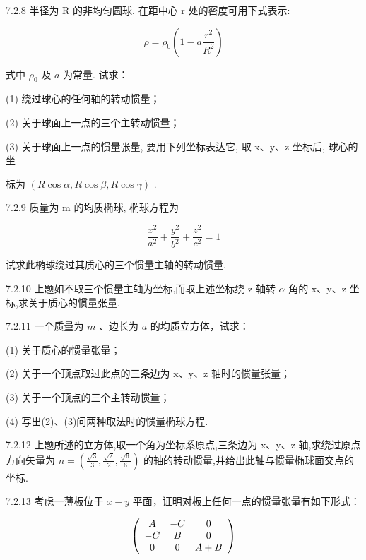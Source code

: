 \begin{problem}{7.2.8}
半径为 R 的非均匀圆球, 在距中心 r 处的密度可用下式表示:

\[
\rho = \rho_ {0} \left(1 - a \frac {r ^ {2}}{R ^ {2}}\right)
\]

式中 $\rho_0$ 及 $a$ 为常量. 试求：

(1) 绕过球心的任何轴的转动惯量；

(2) 关于球面上一点的三个主转动惯量；

(3) 关于球面上一点的惯量张量, 要用下列坐标表达它, 取 x、y、z 坐标后, 球心的坐

标为 $(R\cos\alpha,R\cos\beta,R\cos\gamma)$ .
\end{problem}
\clearpage


\begin{problem}{7.2.9}
质量为 m 的均质椭球, 椭球方程为

\[
\frac {x ^ {2}}{a ^ {2}} + \frac {y ^ {2}}{b ^ {2}} + \frac {z ^ {2}}{c ^ {2}} = 1
\]

试求此椭球绕过其质心的三个惯量主轴的转动惯量.
\end{problem}
\clearpage


\begin{problem}{7.2.10}
上题如不取三个惯量主轴为坐标,而取上述坐标绕 z 轴转 $\alpha$ 角的 x、y、z 坐标,求关于质心的惯量张量.
\end{problem}
\clearpage


\begin{problem}{7.2.11}
一个质量为 $m$ 、边长为 $a$ 的均质立方体，试求：

(1) 关于质心的惯量张量；

(2) 关于一个顶点取过此点的三条边为 x、y、z 轴时的惯量张量；

(3) 关于一个顶点的三个主转动惯量；

(4) 写出(2)、(3)问两种取法时的惯量椭球方程.
\end{problem}
\clearpage


\begin{problem}{7.2.12}
上题所述的立方体,取一个角为坐标系原点,三条边为 x、y、z 轴,求绕过原点方向矢量为 $n=\left(\frac{\sqrt{3}}{3},\frac{\sqrt{2}}{2},\frac{\sqrt{6}}{6}\right)$ 的轴的转动惯量,并给出此轴与惯量椭球面交点的坐标.
\end{problem}
\clearpage


\begin{problem}{7.2.13}
考虑一薄板位于 $x - y$ 平面，证明对板上任何一点的惯量张量有如下形式：

\[
\left( \begin{array}{c c c} A & - C & 0 \\ - C & B & 0 \\ 0 & 0 & A + B \end{array} \right)
\]
\end{problem}
\clearpage


